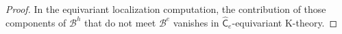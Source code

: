 \documentclass[14pt]{extarticle}
\newcommand{\bA}{\mathsf{A}}
\newcommand{\bG}{\mathsf{G}}
\newcommand{\bC}{\mathsf{C}}
\newcommand{\bCh}{\widehat{\mathsf{C}}}
\newcommand{\cB}{\mathscr{B}}
\newcommand{\fg}{\mathfrak{g}}
\newcommand{\fn}{\mathfrak{n}}
\newcommand{\mov}{\textup{mov}}
\DeclareMathOperator{\pt}{pt}
\newtheorem{Theorem}{Theorem}
\theoremstyle{definition}
\begin{document}




\begin{proof}
In the equivariant localization computation, the 
contribution of those components of $\cB^h$ that do not meet
$\cB^e$ vanishes in $\bCh_e$-equivariant K-theory. 
\end{proof}




\end{document}
